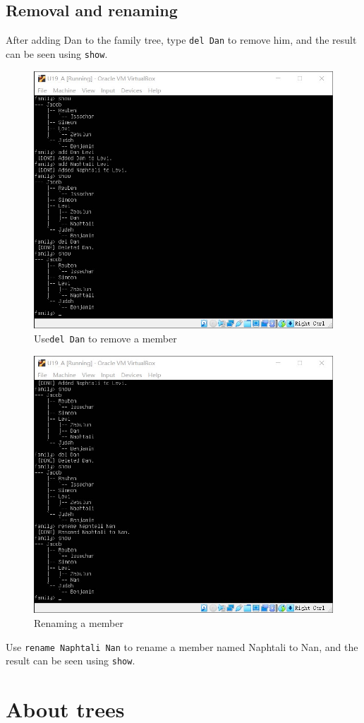 \documentclass[cn,black,12pt,normal]{elegantnote}
\begin{document}
\subsection{Removal and renaming}

After adding Dan to the family tree, type \lstinline{del Dan} to remove him, and the result can be seen using \lstinline{show}.
\begin{figure}[H]
    \centering
    \includegraphics[width=0.7\linewidth]{image/f04.jpg}
    \caption{Use\lstinline{del Dan} to remove a member}
\end{figure}
\begin{figure}[H]
    \centering
    \includegraphics[width=0.7\linewidth]{image/f05.jpg}
    \caption{Renaming a member}
\end{figure}
Use \lstinline{rename Naphtali Nan} to rename a member named Naphtali to Nan, and the result can be seen using \lstinline{show}.


\section{About trees}
\end{document}
